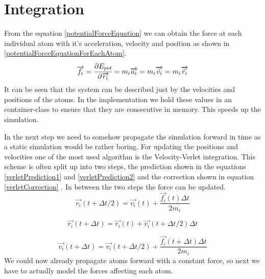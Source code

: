 \section{Integration}
\begin{comment}
- obtain force from the previous equation
- dirivation in v. r.. from the mass
- system can be discribed just by the velocity and postion of each atom
- in the simulation the positions and velocities of the individual atoms have to be tracked and updated accordingly
- most used  is the Velocity-Verlet Algorithm
\end{comment}
From the equation \ref{potentialForceEquation} we can obtain the force at each individual atom with it's acceleration, velocity and position as shown in  \ref{potentialForceEquationForEachAtom}. 
\begin{equation}
	\label{potentialForceEquationForEachAtom}
	\overrightarrow{f_{i}} = \cfrac{\displaystyle\partial E_{pot}}{\displaystyle \partial \overrightarrow{r_{i}}} = m_{i}\overrightarrow{a_{i}} = m_{i}\overrightarrow{\dot{v_{i}}} = m_{i}\overrightarrow{\ddot{r_{i}}}
\end{equation}
It can be seen that the system can be described just by the velocities and positions of the atoms. 
In the implementation we hold these values in an container-class to ensure that they are consecutive in  memory. This speeds up the simulation. 
\par
In the next step we need to somehow propagate the simulation forward in time as a static simulation would be rather boring. For updating the positions and velocities one of the most used algorithm is the Velocity-Verlet integration. 
This scheme is often split up into two steps, the prediction shown in the equations \ref{verletPrediction1} and \ref{verletPrediction2} and the correction shown in equation \ref{verletCorrection} \cite[cf. ][]{molDymCourse}. In between the two steps the force can be updated. 
\begin{equation}
	\label{verletPrediction1}
	\overrightarrow{v_{i}}(t+\Delta t/2) = 
	\overrightarrow{v_{i}}(t) + 
	\frac{\overrightarrow{f_{i}}(t)\Delta t}{2m_{i}}
\end{equation}

\begin{equation}
	\label{verletPrediction2}
	\overrightarrow{r_{i}}(t+\Delta t) = 
	\overrightarrow{r_{i}}(t) + \overrightarrow{v_{i}}(t + \Delta t/2)\Delta t
\end{equation}

\begin{equation}
	\label{verletCorrection}
	\overrightarrow{v_{i}}(t+\Delta t) = \overrightarrow{v_{i}}(t+\Delta t/2) +
	\frac{\overrightarrow{f_{i}}(t + \Delta t)\Delta t}{2m_{i}}
\end{equation}
We could now already propagate atoms forward with a constant force, so next we have to actually model the forces affecting each atom.


